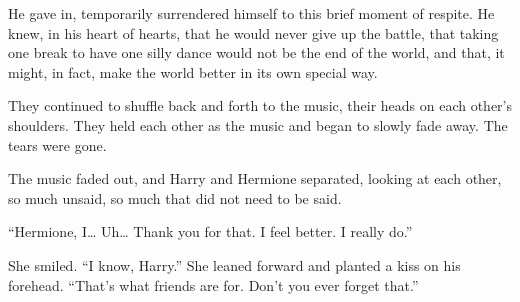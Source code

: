 
He gave in, temporarily surrendered himself to this brief moment of respite. He knew, in his heart of hearts, that he would never give up the battle, that taking one break to have one silly dance would not be the end of the world, and that, it might, in fact, make the world better in its own special way.


They continued to shuffle back and forth to the music, their heads on each other’s shoulders. They held each other as the music and began to slowly fade away. The tears were gone.


The music faded out, and Harry and Hermione separated, looking at each other, so much unsaid, so much that did not need to be said.

“Hermione, I… Uh… Thank you for that. I feel better. I really do.”

She smiled. “I know, Harry.” She leaned forward and planted a kiss on his forehead. “That’s what friends are for. Don’t you ever forget that.”
